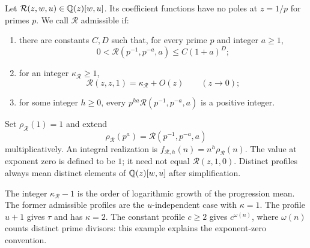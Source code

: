 \begin{definition}
\label{def:v5-log-profile}
Let $\mathcal R(z,w,u)\in\mathbb Q(z)[w,u]$. Its coefficient functions have
no poles at $z=1/p$ for primes $p$. We call $\mathcal R$ admissible if:
\begin{enumerate}
\item there are constants $C,D$ such that, for every prime $p$ and
integer $a\geq1$,
\[
 0<\mathcal R(p^{-1},p^{-a},a)\leq C(1+a)^D;
\]
\item for an integer $\kappa_{\mathcal R}\geq1$,
\[
 \mathcal R(z,z,1)=\kappa_{\mathcal R}+O(z)\qquad(z\longrightarrow0);
\]
\item for some integer $h\geq0$, every
$p^{ha}\mathcal R(p^{-1},p^{-a},a)$ is a positive integer.
\end{enumerate}
Set $\rho_{\mathcal R}(1)=1$ and extend
\[
 \rho_{\mathcal R}(p^a)=\mathcal R(p^{-1},p^{-a},a)
\]
multiplicatively. An integral realization is
$f_{\mathcal R,h}(n)=n^h\rho_{\mathcal R}(n)$.
The value at exponent zero is defined to be $1$; it need not equal
$\mathcal R(z,1,0)$. Distinct profiles always mean distinct elements
of $\mathbb Q(z)[w,u]$ after simplification.
\end{definition}

The integer $\kappa_{\mathcal R}-1$ is the order of logarithmic growth
of the progression mean. The former admissible profiles are the
$u$-independent case with $\kappa=1$. The profile $u+1$ gives $\tau$
and has $\kappa=2$. The constant profile $c\geq2$ gives
$c^{\omega(n)}$, where $\omega(n)$ counts distinct prime divisors:
this example explains the exponent-zero convention.

